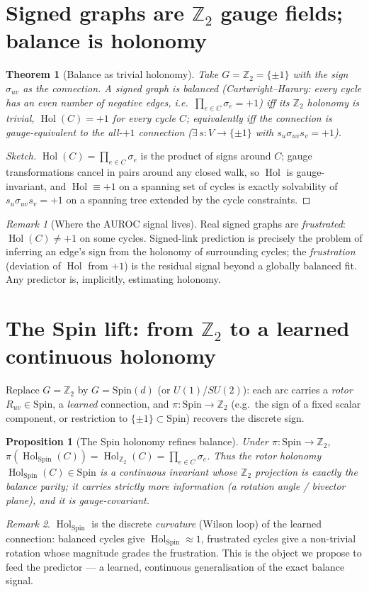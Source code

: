\documentclass[11pt]{article}
\theoremstyle{definition}
\theoremstyle{plain}
\newtheorem{proposition}{Proposition}
\newtheorem{theorem}{Theorem}
\theoremstyle{remark}
\newtheorem{remark}{Remark}
\newcommand{\Hol}{\operatorname{Hol}}
\newcommand{\Spin}{\mathrm{Spin}}
\newcommand{\Z}{\mathbb{Z}}
\begin{document}
\section{Signed graphs are $\Z_2$ gauge fields; balance is holonomy}
\begin{theorem}[Balance as trivial holonomy]\label{thm:balance}
Take $G=\Z_2=\{\pm1\}$ with the sign $\sigma_{uv}$ as the connection. A signed graph is \emph{balanced}
(Cartwright--Harary: every cycle has an even number of negative edges, i.e.\ $\prod_{e\in C}\sigma_e=+1$) iff its
$\Z_2$ holonomy is trivial, $\Hol(C)=+1$ for every cycle $C$; equivalently iff the connection is gauge-equivalent
to the all-$+1$ connection ($\exists\,s:V\to\{\pm1\}$ with $s_u\sigma_{uv}s_v=+1$).
\end{theorem}
\begin{proof}[Sketch] $\Hol(C)=\prod_{e\in C}\sigma_e$ is the product of signs around $C$; gauge transformations
cancel in pairs around any closed walk, so $\Hol$ is gauge-invariant, and $\Hol\equiv+1$ on a spanning set of
cycles is exactly solvability of $s_u\sigma_{uv}s_v=+1$ on a spanning tree extended by the cycle constraints. \end{proof}
\begin{remark}[Where the AUROC signal lives]
Real signed graphs are \emph{frustrated}: $\Hol(C)\ne+1$ on some cycles. Signed-link prediction is precisely the
problem of inferring an edge's sign from the holonomy of surrounding cycles; the \emph{frustration} (deviation of
$\Hol$ from $+1$) is the residual signal beyond a globally balanced fit. Any predictor is, implicitly, estimating
holonomy.
\end{remark}

\section{The Spin lift: from $\Z_2$ to a learned continuous holonomy}
Replace $G=\Z_2$ by $G=\Spin(d)$ (or $U(1)$/$SU(2)$): each arc carries a \emph{rotor} $R_{uv}\in\Spin$, a
\emph{learned} connection, and $\pi:\Spin\to\Z_2$ (e.g.\ the sign of a fixed scalar component, or restriction to
$\{\pm1\}\subset\Spin$) recovers the discrete sign.
\begin{proposition}[The Spin holonomy refines balance]\label{prop:lift}
Under $\pi:\Spin\to\Z_2$, $\pi(\Hol_{\Spin}(C))=\Hol_{\Z_2}(C)=\prod_{e\in C}\sigma_e$. Thus the rotor holonomy
$\Hol_{\Spin}(C)\in\Spin$ is a continuous invariant whose $\Z_2$ projection is exactly the balance parity; it
carries strictly more information (a rotation angle / bivector plane), and it is gauge-covariant.
\end{proposition}
\begin{remark}
$\Hol_{\Spin}$ is the discrete \emph{curvature} (Wilson loop) of the learned connection: balanced cycles give
$\Hol_{\Spin}\!\approx\!1$, frustrated cycles give a non-trivial rotation whose magnitude grades the frustration.
This is the object we propose to feed the predictor --- a learned, continuous generalisation of the exact balance
signal.
\end{remark}
\end{document}
